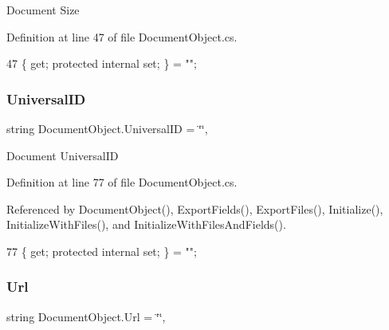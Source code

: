 Document Size 



Definition at line 47 of file Document\+Object.\+cs.


\begin{DoxyCode}
47 \{ \textcolor{keyword}{get}; \textcolor{keyword}{protected} \textcolor{keyword}{internal} \textcolor{keyword}{set}; \} = \textcolor{stringliteral}{""};
\end{DoxyCode}
\mbox{\label{class_document_object_a8b96d04632a2802e7cc5466ca5cee8cf}} 
\subsubsection{\texorpdfstring{Universal\+ID}{UniversalID}}
{\footnotesize\ttfamily string Document\+Object.\+Universal\+ID = \char`\"{}\char`\"{}\hspace{0.3cm}{\ttfamily [get]}, {\ttfamily [set]}}



Document Universal\+ID 



Definition at line 77 of file Document\+Object.\+cs.



Referenced by Document\+Object(), Export\+Fields(), Export\+Files(), Initialize(), Initialize\+With\+Files(), and Initialize\+With\+Files\+And\+Fields().


\begin{DoxyCode}
77 \{ \textcolor{keyword}{get}; \textcolor{keyword}{protected} \textcolor{keyword}{internal} \textcolor{keyword}{set}; \} = \textcolor{stringliteral}{""};
\end{DoxyCode}
\mbox{\label{class_document_object_ac86b730cf8931b2221af577d32ca2f31}} 
\subsubsection{\texorpdfstring{Url}{Url}}
{\footnotesize\ttfamily string Document\+Object.\+Url = \char`\"{}\char`\"{}\hspace{0.3cm}{\ttfamily [get]}, {\ttfamily [set]}}



